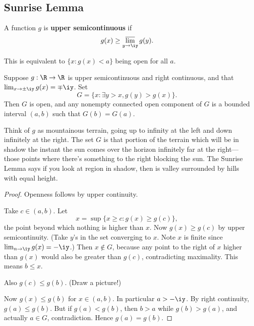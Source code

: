 \subsection{Sunrise Lemma}
\begin{df}
A function $g$ is \textbf{upper semicontinuous} if
\[
g(x)\geq \varlimsup_{y\to\iy} g(y).
\]
\end{df}
This is equivalent to $\{x:g(x)<a\}$ being open for all $a$.
%
\begin{lem}\label{sunrise}
Suppose $g:\R\to \R$ is upper semicontinuous and right continuous, and that $\lim_{x\to \pm \iy}g(x)=\mp\iy$. Set 
\[
G=\{x:\exists y>x, g(y)>g(x)\}.
\]
Then $G$ is open, and any nonempty connected open component of $G$ is a bounded interval $(a,b)$ such that $G(b)=G(a)$.
\end{lem}
Think of $g$ as mountainous terrain, going up to infinity at the left and down infinitely at the right. The set $G$ is that portion of the terrain which will be in shadow the instant the sun comes over the horizon infinitely far at the right---those points where there's something to the right blocking the sun.
The Sunrise Lemma says if you look at region in shadow, then is valley surrounded by hills with equal height.
\begin{proof}
Openness follows by upper continuity.

Take $c\in (a,b)$. Let
\[
x=\sup\{x\ge c:g(x)\ge g(c)\},
\]
the point beyond which nothing is higher than $x$. Now $g(x)\ge g(c)$ by upper semicontinuity. (Take $y$'s in the set converging to $x$. Note $x$ is finite since $\lim_{n\to \iy} g(x)=-\iy$.) 
Then $x\nin G$, because any point to the right of $x$ higher than $g(x)$ would also be greater than $g(c)$, contradicting maximality. This means $b\le x$.

Also $g(c)\le g(b)$. (Draw a picture!) %

Now $g(x)\le g(b)$ for $x\in (a,b)$. In particular $a>-\iy$. By right continuity, $g(a)\le g(b)$. But if $g(a)<g(b)$, then $b>a$ while $g(b)>g(a)$, and actually $a\in G$, contradiction. Hence $g(a)=g(b)$.
\end{proof}
